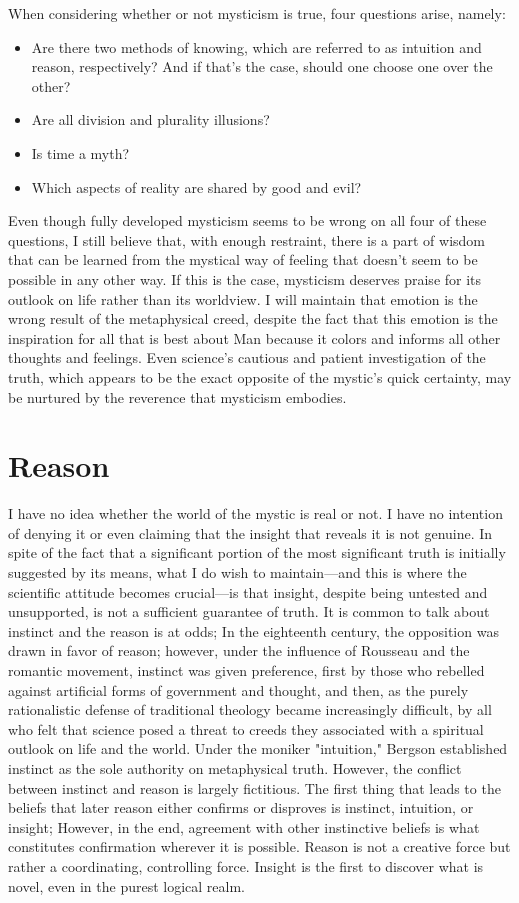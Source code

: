 \documentclass[a4paper,12pt]{book}[2004/02/16]
\theoremstyle{ilemma}
\theoremstyle{itheorem}
\theoremstyle{iother}
\theoremstyle{icorollary}
\theoremstyle{numcorollary}
\theoremstyle{idefinition}
\begin{document}
When considering whether or not mysticism is true, four questions arise, namely:
\begin{itemize}
\item Are there two methods of knowing, which are referred to as intuition and reason, respectively? And if that's the case, should one choose one over the other?

\item Are all division and plurality illusions?

\item Is time a myth?

\item Which aspects of reality are shared by good and evil?
\end{itemize}
Even though fully developed mysticism seems to be wrong on all four of these questions, I still believe that, with enough restraint, there is a part of wisdom that can be learned from the mystical way of feeling that doesn't seem to be possible in any other way. If this is the case, mysticism deserves praise for its outlook on life rather than its worldview. I will maintain that emotion is the wrong result of the metaphysical creed, despite the fact that this emotion is the inspiration for all that is best about Man because it colors and informs all other thoughts and feelings. Even science's cautious and patient investigation of the truth, which appears to be the exact opposite of the mystic's quick certainty, may be nurtured by the reverence that mysticism embodies.
\section{Reason}
I have no idea whether the world of the mystic is real or not. I have no intention of denying it or even claiming that the insight that reveals it is not genuine. In spite of the fact that a significant portion of the most significant truth is initially suggested by its means, what I do wish to maintain—and this is where the scientific attitude becomes crucial—is that insight, despite being untested and unsupported, is not a sufficient guarantee of truth. It is common to talk about instinct and the reason is at odds; In the eighteenth century, the opposition was drawn in favor of reason; however, under the influence of Rousseau and the romantic movement, instinct was given preference, first by those who rebelled against artificial forms of government and thought, and then, as the purely rationalistic defense of traditional theology became increasingly difficult, by all who felt that science posed a threat to creeds they associated with a spiritual outlook on life and the world. Under the moniker "intuition," Bergson established instinct as the sole authority on metaphysical truth. However, the conflict between instinct and reason is largely fictitious. The first thing that leads to the beliefs that later reason either confirms or disproves is instinct, intuition, or insight; However, in the end, agreement with other instinctive beliefs is what constitutes confirmation wherever it is possible. Reason is not a creative force but rather a coordinating, controlling force. Insight is the first to discover what is novel, even in the purest logical realm.
\end{document}
